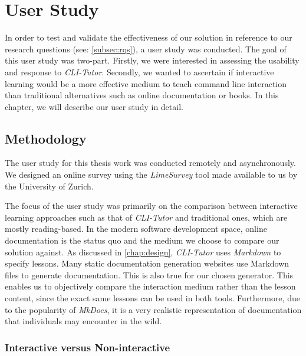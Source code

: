 \chapter{User Study}
\label{chap:userstudy}

In order to test and validate the effectiveness of our solution in reference to
our research questions (see: \autoref{subsec:rqs}), a user study was conducted.
The goal of this user study was two-part. Firstly, we were interested in
assessing the usability and response to \textit{CLI-Tutor}. Secondly, we wanted
to ascertain if interactive learning would be a more effective medium to teach
command line interaction than traditional alternatives such as online
documentation or books. In this chapter, we will describe our user study in
detail.

\section{Methodology}

The user study for this thesis work was conducted remotely and asynchronously.
We designed an online survey using the \textit{LimeSurvey}\cite{schmitzlime}
tool made available to us by the University of Zurich.

The focus of the user study was primarily on the comparison between interactive
learning approaches such as that of \textit{CLI-Tutor} and traditional ones,
which are mostly reading-based. In the modern software development space,
online documentation is the status quo and the medium we choose to compare our
solution against. As discussed in \autoref{chap:design}, \textit{CLI-Tutor}
uses \textit{Markdown} to specify lessons. Many static documentation generation
websites use Markdown files to generate documentation. This is also true
for our chosen generator. This enables us to objectively compare the
interaction medium rather than the lesson content, since the exact same lessons
can be used in both tools. Furthermore, due to the popularity of
\textit{MkDocs}, it is a very realistic representation of documentation that
individuals may encounter in the wild.


\subsection{Interactive versus Non-interactive}

